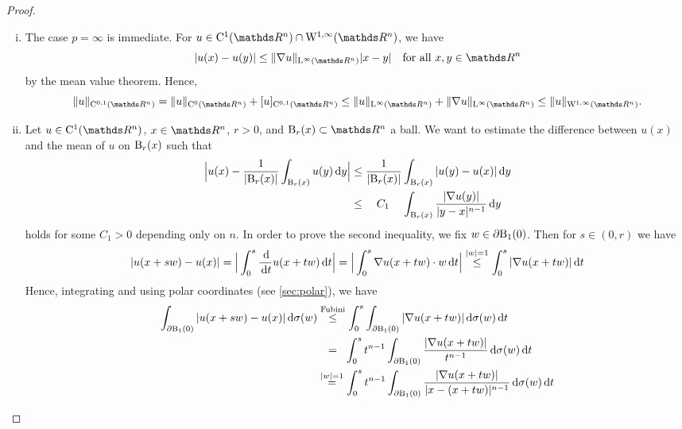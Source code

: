 \begin{proof}
  \begin{enumerate}[i)]
    \item The case $p = \infty$ is immediate.
      For $u \in \CC^1(\R^n) \cap \WW^{1,\infty}(\R^n)$, we have
      $$
      |u(x) - u(y)| \leq \| \nabla u\|_{\Ell^\infty(\R^n)} | x - y| \quad\text{for all } x, y \in \R^n
      $$
      by the mean value theorem.
      Hence,
      $$
      \|u\|_{\CC^{0,1}(\R^n)}
      = \| u\|_{\CC^0(\R^n)} + [u ]_{\CC^{0,1}(\R^n)}
      \leq \|u\|_{\Ell^\infty(\R^n)} + \|\nabla u\|_{\Ell^\infty(\R^n)}
      \leq \| u\|_{\WW^{1,\infty}(\R^n)}.
      $$

    \item Let $u \in \CC^1(\R^n)$, $x \in \R^n$, $r > 0$,  and $\BB_r(x) \subset \R^n$ a ball.
      We want to estimate the difference between $u(x)$ and the mean of $u$ on $\mathrm{B}_r(x)$
      such that
      \begin{equation}
        \label{eq:meanEstimateByGradient}
        \begin{alignedat}{2}
        \Big| u(x) - \frac{1}{|\mathrm{B}_r(x)|} \int_{\mathrm{B}_r(x)} u(y) \, {\operatorname{d}\!{y}} \Big|
          &\leq \frac{1}{|\mathrm{B}_r(x)|} &&\int_{\mathrm{B}_r(x)} |u(y) - u(x)| \, {\operatorname{d}\!{y}}\\
          &\leq \quad C_1 &&\int_{\mathrm{B}_r(x)} \frac{|\nabla u(y)|}{|y - x|^{n - 1}} \, {\operatorname{d}\!{y}}
      \end{alignedat}
      \end{equation}
      holds for some $C_1 > 0$ depending only on $n$.
      In order to prove the second inequality, we fix $w \in \partial\mathrm{B}_1(0)$.
      Then for $s \in (0,r)$ we have
      $$
      |u(x + sw) - u(x)|
      = \Big| \int_0^s \frac{\, {\operatorname{d}\!{}} }{\, {\operatorname{d}\!{t}}} u(x + tw) \, {\operatorname{d}\!{t}} \Big|
      = \Big| \int_0^s \nabla u(x + tw) \cdot w \, {\operatorname{d}\!{t}}  \Big|
      \overset{|w| = 1}{\leq} \int_0^s |\nabla u(x + tw)| \, {\operatorname{d}\!{t}}
      $$
      Hence, integrating and using polar coordinates (see \ref{sec:polar}), we have
      \begin{align*}
        \int_{\partial\BB_1(0)} | u(x + sw) - u(x)| \d \sigma(w)
        &\overset{\text{Fubini}}{\leq} \int_0^s \int_{\partial\BB_1(0)} |\nabla u(x + t w)| \d\sigma(w) \d t \\
        &\;\;\,= \;\;\int_0^s t^{n - 1} \int_{\partial\BB_1(0)} \frac{|\nabla u(x + tw)|}{t^{n - 1}} \d \sigma(w) \d t \\
        &\overset{|w| = 1}{=} \int_0^s t^{n - 1} \int_{\partial\BB_1(0)} \frac{|\nabla u(x + tw)|}{|x - (x + tw)|^{n - 1}} \d \sigma(w) \d t \\

\end{align*}
\end{enumerate}
\end{proof}
